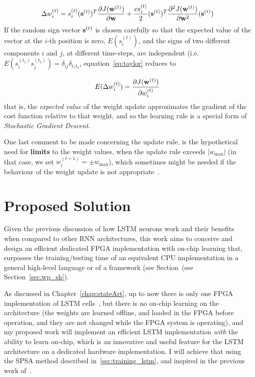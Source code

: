 \begin{equation}\label{eq:taylor}
    \Delta w_i^{(t)} = s_i^{(t)} (\mathbf{s}^{(t)})^T \frac{\partial J(\mathbf{w}^{(t)})}{\partial \mathbf{w}} +
                        \frac{c s_i^{(t)}}{2} (\mathbf{s}^{(t)})^T \frac{\partial^2 J(\mathbf{w}^{(t)})}{\partial \mathbf{w}^2}  (\mathbf{s}^{(t)}) 
\end{equation}
If the random sign vector $\mathbf{s}^{(t)}$ is chosen carefully so that the expected value of the vector at the $i$-th position is zero, $E(s_i^{(t)})$, and the signs of two different components $i$ and $j$, at different time-steps, are independent (i.e. $E(s_i^{(t_1)}s_j^{(t_2)}) = \delta_{ij}\delta_{t_1 t_2}$, equation~\ref{eq:taylor} reduces to

\begin{equation}\label{eq:spsa_gradProof}
    E(\Delta w_i^{(t)}) = \frac{\partial J(\mathbf{w}^{(t)})}{\partial w_i^{(t)}}
\end{equation}
that is, the \emph{expected value} of the weight update approximates the gradient of the cost function relative to that weight, and so the learning rule is a special form of \textit{Stochastic Gradient Descent}.

One last comment to be made concerning the update rule, is the hypothetical need for \textbf{limits} to the weight values, when the update rule exceeds $|w_{\text{max}}|$ (in that case, we set $w_i^{(t+1)} = \pm w_{\text{max}}$), which sometimes might be needed if the behaviour of the weight update is not appropriate~\cite{Maeda05}.

\section{Proposed Solution}\label{sec:propSol}
Given the previous discussion of how LSTM neurons work and their benefits when compared to other RNN architectures, this work aims to conceive and design an efficient dedicated FPGA implementation with on-chip learning that, surpasses the training/testing time of an equivalent CPU implementation in a general high-level language or of a framework (see Section~\re (see Section~\ref{sec:wp_sh}). 

As discussed in Chapter~\ref{chap:stateArt}, up to now there is only one FPGA implementation of LSTM cells~\cite{Chang15}, but there is no on-chip learning on the architecture (the weights are learned offline, and loaded in the FPGA before operation, and they are not changed while the FPGA system is operating), and my proposed work will implement an efficient LSTM implementation \emph{with} the ability to learn on-chip, which is an innovative and useful feature for the LSTM architecture on a dedicated hardware implementation. I will achieve that using the SPSA method described in~\ref{sec:training_lstm}, and inspired in the previous work of~\cite{Maeda05}.

